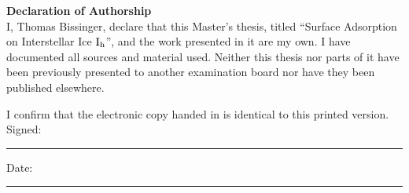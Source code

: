
\begin{center}
\begin{minipage}{.8\textwidth}
{\Huge\textbf{Declaration of Authorship}\\[20pt]}
\Large\noindent I, Thomas Bissinger, declare that this Master's thesis, titled
``Surface Adsorption on Interstellar Ice $\text I_\text h$'', and the
work presented in it are my own. I have documented all sources and material
used. Neither this thesis nor parts of it have been previously presented to
another examination board nor have they been published elsewhere.

I confirm that the electronic copy handed in is identical to this printed
version.\\[10pt]
 
\noindent Signed:\\
\rule[0.5em]{25em}{0.5pt} %
 
\noindent Date:\\
\rule[0.5em]{25em}{0.5pt} %
\end{minipage}
\end{center}
\cleardoublepage

